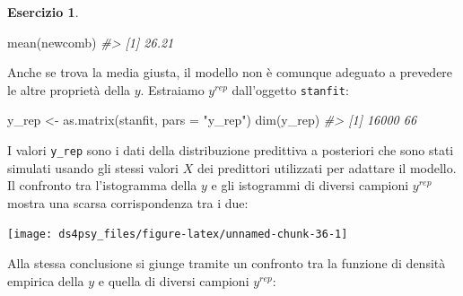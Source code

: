 \documentclass[
  11pt,
]{krantz}
\makeatletter
\newenvironment{Shaded}{\begin{snugshade}}{\end{snugshade}}
\newcommand{\AttributeTok}[1]{\textcolor[rgb]{0.61,0.61,0.61}{#1}}
\newcommand{\CommentTok}[1]{\textcolor[rgb]{0.37,0.37,0.37}{\textit{#1}}}
\newcommand{\DecValTok}[1]{\textcolor[rgb]{0.06,0.06,0.06}{#1}}
\newcommand{\FunctionTok}[1]{\textcolor[rgb]{0,0,0}{#1}}
\newcommand{\NormalTok}[1]{#1}
\newcommand{\OtherTok}[1]{\textcolor[rgb]{0.37,0.37,0.37}{#1}}
\newcommand{\SpecialCharTok}[1]{\textcolor[rgb]{0,0,0}{#1}}
\newcommand{\StringTok}[1]{\textcolor[rgb]{0.5,0.5,0.5}{#1}}
\newenvironment{kframe}{%
\medskip{}
\setlength{\fboxsep}{.8em}
 \def\at@end@of@kframe{}%
 \ifinner\ifhmode%
  \def\at@end@of@kframe{\end{minipage}}%
  \begin{minipage}{\columnwidth}%
 \fi\fi%
 \def\FrameCommand##1{\hskip\@totalleftmargin \hskip-\fboxsep
 \colorbox{shadecolor}{##1}\hskip-\fboxsep
     \hskip-\linewidth \hskip-\@totalleftmargin \hskip\columnwidth}%
 \MakeFramed {\advance\hsize-\width
   \@totalleftmargin\z@ \linewidth\hsize
   \@setminipage}}%
 {\par\unskip\endMakeFramed%
 \at@end@of@kframe}
\renewenvironment{Shaded}{\begin{kframe}}{\end{kframe}}
\theoremstyle{definition}
\theoremstyle{definition}
\theoremstyle{definition}
\newtheorem{exercise}{Esercizio}[chapter]
\theoremstyle{definition}
\theoremstyle{remark}
\makeatother
\begin{document}
\begin{exercise}
\begin{Shaded}
\begin{Highlighting}[]
\FunctionTok{mean}\NormalTok{(newcomb)}
\CommentTok{\#\textgreater{} [1] 26.21}
\end{Highlighting}
\end{Shaded}

Anche se trova la media giusta, il modello non è comunque adeguato a prevedere le altre proprietà della \(y\). Estraiamo \(y^{rep}\) dall'oggetto \texttt{stanfit}:

\begin{Shaded}
\begin{Highlighting}[]
\NormalTok{y\_rep }\OtherTok{\textless{}{-}} \FunctionTok{as.matrix}\NormalTok{(stanfit, }\AttributeTok{pars =} \StringTok{"y\_rep"}\NormalTok{)}
\FunctionTok{dim}\NormalTok{(y\_rep)}
\CommentTok{\#\textgreater{} [1] 16000    66}
\end{Highlighting}
\end{Shaded}

I valori \texttt{y\_rep} sono i dati della distribuzione predittiva a posteriori che sono stati simulati usando gli stessi valori \(X\) dei predittori utilizzati per adattare il modello. Il confronto tra l'istogramma della \(y\) e gli istogrammi di diversi campioni \(y^{rep}\) mostra una scarsa corrispondenza tra i due:

\begin{Shaded}
\end{Shaded}

\begin{center}\texttt{[image: ds4psy\_files/figure-latex/unnamed-chunk-36-1]} \end{center}

Alla stessa conclusione si giunge tramite un confronto tra la funzione di densità empirica della \(y\) e quella di diversi campioni \(y^{rep}\):

\begin{Shaded}
\end{Shaded}


\end{exercise}
\end{document}
